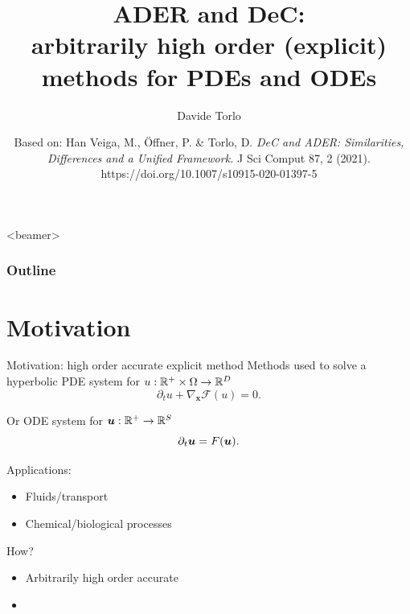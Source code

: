 \documentclass[aspectratio=169]{beamer}
\title[ADER vs DeC]{ADER and DeC: \\ arbitrarily high order (explicit)\\ methods for PDEs and ODEs}
\author[D. Torlo]{Davide Torlo}
\institute[SISSA]
{SISSA Mathlab}
\date[]
{\small Based on: Han Veiga, M., Öffner, P. \& Torlo, D. \textit{DeC and ADER: Similarities, Differences and a Unified Framework.} J Sci Comput 87, 2 (2021). https://doi.org/10.1007/s10915-020-01397-5
}
\begin{document}
\begin{frame}

\titlepage



\end{frame}

\begin{frame}<beamer>
	\frametitle{Outline}
	  \tableofcontents
\end{frame}

\section{Motivation}

\begin{frame}{Motivation: high order accurate explicit method}
	Methods used to solve a hyperbolic  PDE system for $u:\mathbb{R}^+\times \Omega \to \mathbb{R}^D$
	\begin{equation}\label{eq:scalarPDE}
		\partial_t u + \nabla_{\mathbf{x}} \mathcal{F}(u) =0.
	\end{equation}

	Or ODE system for $\boldsymbol{u}:\mathbb{R}^+\to \mathbb{R}^S$
	\begin{equation}\label{eq:scalarODE}
		\partial_t \boldsymbol{u} = F(\boldsymbol{u}) .
	\end{equation}
	
	Applications:
	\begin{itemize}
		\item Fluids/transport
		\item Chemical/biological processes
	\end{itemize}
	\vspace{5mm}
	
	How?
	\begin{itemize}
		\item Arbitrarily high order accurate
		\item {}
	\end{itemize}
	

\end{frame}
\end{document}
